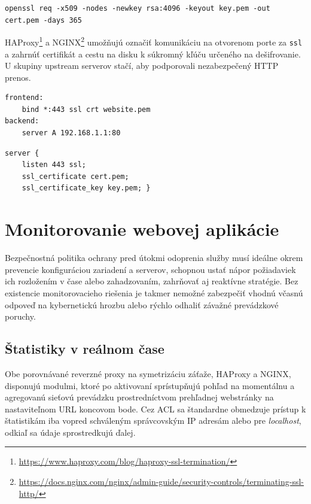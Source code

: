 \documentclass[12pt, a4paper]{article}
\begin{document}
\noindent\begin{lstlisting}[caption=OpenSSL požiadavka (CSR) na samo popísanie certifikátu X.509 so súkromným kľúčom RSA o dĺžke 4096 bitov a ročnou platnosťou, basicstyle=\ttfamily\scriptsize]
openssl req -x509 -nodes -newkey rsa:4096 -keyout key.pem -out cert.pem -days 365
\end{lstlisting}

HAProxy\footnote{\url{https://www.haproxy.com/blog/haproxy-ssl-termination/}} 
a NGINX\footnote{\url{https://docs.nginx.com/nginx/admin-guide/security-controls/terminating-ssl-http/}}
umožňujú označiť komunikáciu na otvorenom porte za \verb|ssl| a zahrnúť certifikát a cestu na disku k 
súkromný kľúču určeného na dešifrovanie. U skupiny upstream serverov stačí, aby podporovali 
nezabezpečený HTTP prenos.  
 
\noindent\begin{minipage}{.48\textwidth}
\begin{lstlisting}[caption=HAProxy: TLS termination]
frontend:
    bind *:443 ssl crt website.pem 
backend:
    server A 192.168.1.1:80
\end{lstlisting}
\end{minipage}\hfill
\begin{minipage}{.48\textwidth}
\begin{lstlisting}[caption=NGINX: TLS termination]
server {
    listen 443 ssl;
    ssl_certificate cert.pem;
    ssl_certificate_key key.pem; }
\end{lstlisting}
\end{minipage}

\section{Monitorovanie webovej aplikácie}
Bezpečnostná politika ochrany pred útokmi odoprenia služby musí ideálne okrem prevencie
konfiguráciou zariadení a serverov, schopnou ustať nápor požiadaviek ich rozložením v čase alebo
zahadzovaním, zahrňovať aj reaktívne stratégie. Bez existencie monitorovacieho riešenia je
takmer nemožné zabezpečiť vhodnú včasnú odpoveď na kybernetickú hrozbu alebo rýchlo odhaliť 
závažné prevádzkové poruchy.

\subsection{Štatistiky v reálnom čase}
Obe porovnávané reverzné proxy na symetrizáciu záťaže, HAProxy a NGINX, disponujú modulmi, ktoré po 
aktivovaní sprístupňujú pohľad na momentálnu a agregovanú sieťovú prevádzku prostredníctvom
prehľadnej webstránky na nastaviteľnom URL koncovom bode. Cez ACL sa štandardne obmedzuje prístup
k štatistikám iba vopred schváleným správcovským IP adresám alebo pre \emph{localhost}, odkiaľ
sa údaje sprostredkujú ďalej.
\end{document}
